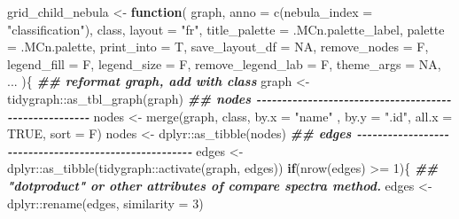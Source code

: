 \documentclass[
]{article}
\newenvironment{Shaded}{\begin{snugshade}}{\end{snugshade}}
\newcommand{\AttributeTok}[1]{\textcolor[rgb]{0.77,0.63,0.00}{#1}}
\newcommand{\ConstantTok}[1]{\textcolor[rgb]{0.00,0.00,0.00}{#1}}
\newcommand{\ControlFlowTok}[1]{\textcolor[rgb]{0.13,0.29,0.53}{\textbf{#1}}}
\newcommand{\DecValTok}[1]{\textcolor[rgb]{0.00,0.00,0.81}{#1}}
\newcommand{\DocumentationTok}[1]{\textcolor[rgb]{0.56,0.35,0.01}{\textbf{\textit{#1}}}}
\newcommand{\FunctionTok}[1]{\textcolor[rgb]{0.00,0.00,0.00}{#1}}
\newcommand{\NormalTok}[1]{#1}
\newcommand{\OtherTok}[1]{\textcolor[rgb]{0.56,0.35,0.01}{#1}}
\newcommand{\SpecialCharTok}[1]{\textcolor[rgb]{0.00,0.00,0.00}{#1}}
\newcommand{\StringTok}[1]{\textcolor[rgb]{0.31,0.60,0.02}{#1}}
\begin{document}
\begin{Shaded}
\begin{Highlighting}[]
\NormalTok{grid\_child\_nebula }\OtherTok{\textless{}{-}}
  \ControlFlowTok{function}\NormalTok{(}
\NormalTok{           graph,}
           \AttributeTok{anno =} \FunctionTok{c}\NormalTok{(}\AttributeTok{nebula\_index =} \StringTok{"classification"}\NormalTok{),}
\NormalTok{           class,}
           \AttributeTok{layout =} \StringTok{"fr"}\NormalTok{,}
           \AttributeTok{title\_palette =}\NormalTok{ .MCn.palette\_label,}
           \AttributeTok{palette =}\NormalTok{ .MCn.palette,}
           \AttributeTok{print\_into =}\NormalTok{ T,}
           \AttributeTok{save\_layout\_df =} \ConstantTok{NA}\NormalTok{,}
           \AttributeTok{remove\_nodes =}\NormalTok{ F,}
           \AttributeTok{legend\_fill =}\NormalTok{ F,}
           \AttributeTok{legend\_size =}\NormalTok{ F,}
           \AttributeTok{remove\_legend\_lab =}\NormalTok{ F,}
           \AttributeTok{theme\_args =} \ConstantTok{NA}\NormalTok{,}
\NormalTok{           ...}
\NormalTok{           )\{}
    \DocumentationTok{\#\# reformat graph, add with class}
\NormalTok{    graph }\OtherTok{\textless{}{-}}\NormalTok{ tidygraph}\SpecialCharTok{::}\FunctionTok{as\_tbl\_graph}\NormalTok{(graph)}
    \DocumentationTok{\#\# nodes {-}{-}{-}{-}{-}{-}{-}{-}{-}{-}{-}{-}{-}{-}{-}{-}{-}{-}{-}{-}{-}{-}{-}{-}{-}{-}{-}{-}{-}{-}{-}{-}{-}{-}{-}{-}{-}{-}{-}{-}{-}{-}{-}{-}{-}{-}{-}{-}{-}{-}{-}{-}{-}{-}}
\NormalTok{    nodes }\OtherTok{\textless{}{-}} \FunctionTok{merge}\NormalTok{(graph, class, }\AttributeTok{by.x =} \StringTok{"name"}\NormalTok{ , }\AttributeTok{by.y =} \StringTok{".id"}\NormalTok{, }\AttributeTok{all.x =} \ConstantTok{TRUE}\NormalTok{, }\AttributeTok{sort =}\NormalTok{ F)}
\NormalTok{    nodes }\OtherTok{\textless{}{-}}\NormalTok{ dplyr}\SpecialCharTok{::}\FunctionTok{as\_tibble}\NormalTok{(nodes)}
    \DocumentationTok{\#\# edges {-}{-}{-}{-}{-}{-}{-}{-}{-}{-}{-}{-}{-}{-}{-}{-}{-}{-}{-}{-}{-}{-}{-}{-}{-}{-}{-}{-}{-}{-}{-}{-}{-}{-}{-}{-}{-}{-}{-}{-}{-}{-}{-}{-}{-}{-}{-}{-}{-}{-}{-}{-}{-}{-}}
\NormalTok{    edges }\OtherTok{\textless{}{-}}\NormalTok{ dplyr}\SpecialCharTok{::}\FunctionTok{as\_tibble}\NormalTok{(tidygraph}\SpecialCharTok{::}\FunctionTok{activate}\NormalTok{(graph, edges))}
    \ControlFlowTok{if}\NormalTok{(}\FunctionTok{nrow}\NormalTok{(edges) }\SpecialCharTok{\textgreater{}=} \DecValTok{1}\NormalTok{)\{}
      \DocumentationTok{\#\# "dotproduct" or other attributes of compare spectra method.}
\NormalTok{      edges }\OtherTok{\textless{}{-}}\NormalTok{ dplyr}\SpecialCharTok{::}\FunctionTok{rename}\NormalTok{(edges, }\AttributeTok{similarity =} \DecValTok{3}\NormalTok{)}

\end{Highlighting}
\end{Shaded}
\end{document}
